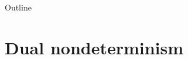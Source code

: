 \documentclass{beamer}
\newcommand{\htr}[3]{{ {#1} \mathbbm{\{} {#2} \mathbbm{\}} {#3} }}
\begin{document}
\begin{frame}{Outline} %
  \tableofcontents
\end{frame}


\section{Dual nondeterminism} %

%
%
%
\end{document}
